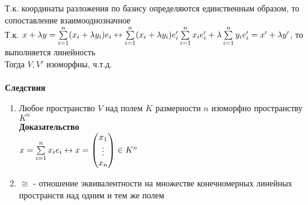 \documentclass[12pt]{article}
\begin{document}
Т.к. координаты разложения по базису определяются единственным образом, то сопоставление взаимооднозначное\\
Т.к. $x+\lambda y = \sum\limits_{i=1}^n (x_i+\lambda y_i)e_i \leftrightarrow \sum\limits_{i=1}^n (x_i+\lambda y_i)e_i' \sum\limits_{i=1}^n x_ie_i' + \lambda \sum\limits_{i=1}^n y_ie_i' = x' + \lambda y'$, то выполняется линейность\\
Тогда $V, V'$ изоморфны, ч.т.д.\\\\
\textbf{Следствия}
\begin{enumerate}
    \item Любое пространство $V$ над полем $K$ размерности $n$ изоморфно пространству $K^n$\\
    \textbf{Доказательство}\\
    $x = \sum\limits_{i=1}^n x_ie_i \leftrightarrow x = \begin{pmatrix}
        x_1\\
        \vdots\\
        x_n
    \end{pmatrix} \in K^n$
    \item $\cong$ - отношение эквивалентности на множестве конечномерных линейных пространств над одним и тем же полем
\end{enumerate}
\end{document}

